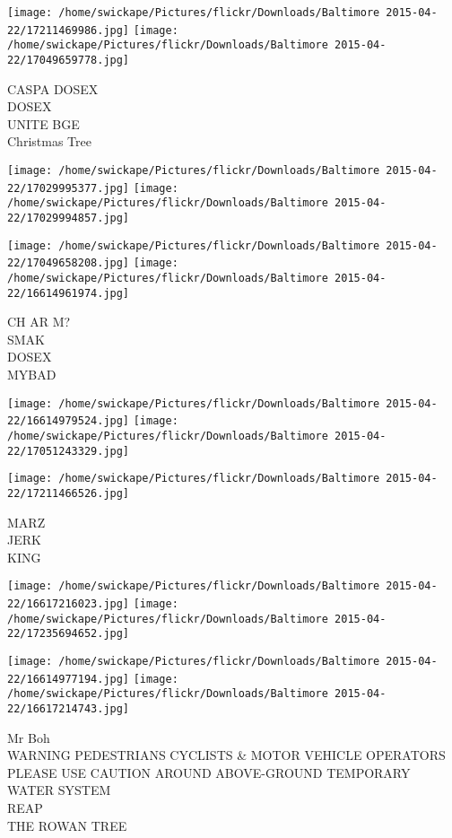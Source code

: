 \documentclass[10pt,letterpaper]{article}
\begin{document}
\texttt{[image: /home/swickape/Pictures/flickr/Downloads/Baltimore 2015-04-22/17211469986.jpg]}
\texttt{[image: /home/swickape/Pictures/flickr/Downloads/Baltimore 2015-04-22/17049659778.jpg]}

CASPA DOSEX\\
DOSEX\\
UNITE BGE\\
Christmas Tree\\
\pagebreak

\texttt{[image: /home/swickape/Pictures/flickr/Downloads/Baltimore 2015-04-22/17029995377.jpg]}
\texttt{[image: /home/swickape/Pictures/flickr/Downloads/Baltimore 2015-04-22/17029994857.jpg]}

\texttt{[image: /home/swickape/Pictures/flickr/Downloads/Baltimore 2015-04-22/17049658208.jpg]}
\texttt{[image: /home/swickape/Pictures/flickr/Downloads/Baltimore 2015-04-22/16614961974.jpg]}

CH AR M?\\
SMAK\\
DOSEX\\
MYBAD\\
\pagebreak

\texttt{[image: /home/swickape/Pictures/flickr/Downloads/Baltimore 2015-04-22/16614979524.jpg]}
\texttt{[image: /home/swickape/Pictures/flickr/Downloads/Baltimore 2015-04-22/17051243329.jpg]}

\vspace{0.25in}
\texttt{[image: /home/swickape/Pictures/flickr/Downloads/Baltimore 2015-04-22/17211466526.jpg]}

MARZ\\
JERK\\
KING\\
\pagebreak

\texttt{[image: /home/swickape/Pictures/flickr/Downloads/Baltimore 2015-04-22/16617216023.jpg]}
\texttt{[image: /home/swickape/Pictures/flickr/Downloads/Baltimore 2015-04-22/17235694652.jpg]}

\texttt{[image: /home/swickape/Pictures/flickr/Downloads/Baltimore 2015-04-22/16614977194.jpg]}
\texttt{[image: /home/swickape/Pictures/flickr/Downloads/Baltimore 2015-04-22/16617214743.jpg]}

Mr Boh\\
WARNING PEDESTRIANS CYCLISTS \& MOTOR VEHICLE OPERATORS PLEASE USE CAUTION AROUND ABOVE{-}GROUND TEMPORARY WATER SYSTEM\\
REAP\\
THE ROWAN TREE\\
\pagebreak
\end{document}
